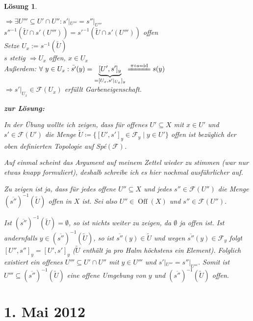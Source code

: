 \documentclass[paper = A4, fontsize=12pt, numbers=noendperiod, chapterprefix=true]{scrbook}
\theoremstyle{break}
\newtheorem{Loes}{L\"osung}
\theoremstyle{nonumberbreak}
\theoremstyle{nonumberplain}
\newcommand{\quot}[1]{\textrm{\glqq}{#1}\textrm{\grqq}}
\newenvironment{twosidedproof}{\begin{enumerate}[\quot{$\Rightarrow$}:]}{\end{enumerate}}
\DeclareMathOperator{\Off}{Off}
\DeclareMathOperator{\id}{id}
\newcommand{\calF}{\mathcal{F}}
\begin{document}
\begin{Loes}
\begin{twosidedproof}
  $\Rightarrow \exists U''' \subseteq U'\cap U'': s'|_{U'''} = s''|_{U'''}$\\
  $s''^{-1}(\widetilde U \cap s'(U''')) = s'^{-1}(\widetilde U \cap s'(U'''))$ offen\\
  Setze $U_x:= s^{-1}(\widetilde U)$\\
  $s$ stetig $\Rightarrow U_x$ offen, $x\in U_x$\\
  Au\ss erdem: $\forall\  y \in U_x: \bar{s'}(y) = \underbrace{[U', s']_y}_{=[U_x, s'|_{U_x}]_y} \xlongequal{\pi \circ s = \id} s(y)$\\
  $\Rightarrow s'|_{U_x} \in \calF(U_x)$ erf\"ullt Garbeneigenschaft.
\end{twosidedproof}

\textbf{zur L\"osung:}

In der \"Ubung wollte ich zeigen, dass f\"ur offenes $U' \subseteq X$ mit $x \in U'$ und $s' \in \mathcal{F}(U')$ die Menge $\tilde{U} \coloneqq \{ [U',s']_y \in \mathcal{F}_y \mid y \in U' \}$ offen ist bez\"uglich der oben definierten Topologie auf Sp\'e$(\mathcal{F})$.

Auf einmal scheint das Argument auf meinem Zettel wieder zu stimmen (war nur etwas knapp formuliert), deshalb schreibe ich es hier nochmal ausf\"uhrlicher auf.

Zu zeigen ist ja, dass f\"ur jedes offene $U'' \subseteq X$ und jedes $s'' \in \mathcal{F}(U'')$ die Menge $\left(\overline{s''}\right)^{-1}\left(\tilde{U}\right)$ offen in $X$ ist. Sei also $U'' \in \Off(X)$ und $s'' \in \mathcal{F}(U'')$.

Ist $\left(\overline{s''}\right)^{-1}\left(\tilde{U}\right) = \emptyset$, so ist nichts weiter zu zeigen, da $\emptyset$ ja offen ist. Ist andernfalls $y \in \left(\overline{s''}\right)^{-1}\left(\tilde{U}\right)$, so ist $ \overline{s''}(y) \in \tilde{U}$ und wegen $\overline{s''}(y) \in \mathcal{F}_y$ folgt $[U'',s'']_y = [U',s']_y$ ($\tilde{U}$ enth\"alt ja pro Halm h\"ochstens ein Element). Folglich existiert ein offenes $U''' \subseteq U' \cap U''$ mit $y \in U'''$ und $s'|_{U'''} = s''|_{U'''}$. Somit ist $U''' \subseteq \left(\overline{s''}\right)^{-1}\left(\tilde{U}\right)$ eine offene Umgebung von $y$ und $\left(\overline{s''}\right)^{-1}\left(\tilde{U}\right)$ offen.

\end{Loes}

\newpage
\section{1. Mai 2012}
\setcounter{Aufg}{0}
\setcounter{Loes}{0}
\end{document}

